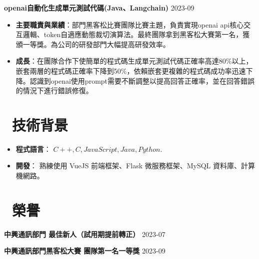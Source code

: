 \documentclass[10pt, a4paper]{article}
\begin{document}
\textbf{openai自動化生成單元測試代碼(Java、Langchain)} \hfill 2023-09

\begin{itemize}[parsep=0.5ex]
\item \textbf{主要職責與業績}：部門黑客松比賽團隊比賽主題，負責實現openai api核心交互邏輯、token自適應動態裁切演算法。最終團隊拿到黑客松大賽第一名，獲頒一等獎。為公司的研發部門大幅提高研發效率。

\item \textbf{成長}：在團隊合作下使簡單的程式碼生成單元測試代碼正確率高達80\%以上，嵌套兩層的程式碼正確率下降到50\%，依賴嵌套更複雜的程式碼成功率迅速下降。認識到openai使用prompt需要不斷調整以提高回答正確率，並在回答錯誤的情況下進行錯誤修復。
\end{itemize}

\section{\color{CVBlue}\faCogs\ 技術背景}
\begin{itemize}[parsep=0.5ex]
  \item \textbf{程式語言}： $C++, C, JavaScript, Java, Python$.
  \item \textbf{開發}： 熟練使用 VueJS 前端框架、Flask 微服務框架、MySQL 資料庫、計算機網路。
\end{itemize}

\section{\color{CVBlue}\faHeart\ 榮譽}

\textbf{中興通訊部門 \quad 最佳新人（試用期提前轉正）} \hfill 2023-07

\textbf{中興通訊部門黑客松大賽 \quad 團隊第一名一等獎} \hfill 2023-09


\end{document}

